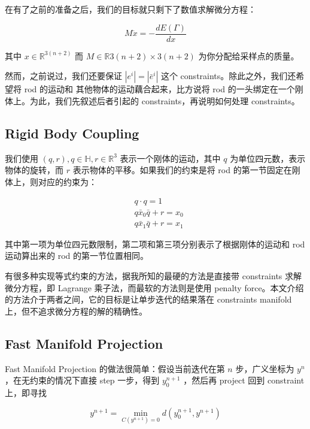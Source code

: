 \documentclass{notes}
\begin{document}
在有了之前的准备之后，我们的目标就只剩下了数值求解微分方程：

\begin{equation}
	M \ddot{x} = - \frac{d E(\Gamma)}{d x}
\end{equation}

其中 $x \in \mathbb{R}^{3(n + 2)}$ 而 $M \in \mathbb{R}{3(n + 2) \times 3(n + 2)}$ 为你分配给采样点的质量。

然而，之前说过，我们还要保证 $\left|e^i\right| = \left|\bar{e}^i\right|$ 这个 constraints。除此之外，我们还希望将 rod 的运动和 其他物体的运动藕合起来，比方说将 rod 的一头绑定在一个刚体上。为此，我们先叙述后者引起的 constraints，再说明如何处理 constraints。

\subsection{Rigid Body Coupling}

我们使用 $(q, r), q \in \mathbb{H}, r \in \mathbb{R}^3$ 表示一个刚体的运动，其中 $q$ 为单位四元数，表示物体的旋转，而 $r$ 表示物体的平移。如果我们的约束是将 rod 的第一节固定在刚体上，则对应的约束为：

\begin{equation}
	\begin{aligned}
		&q \cdot q = 1 \\
		&q \bar{x}_0 \bar{q} + r = x_0 \\
		&q \bar{x}_1 \bar{q} + r = x_1
	\end{aligned}
\end{equation}

其中第一项为单位四元数限制，第二项和第三项分别表示了根据刚体的运动和 rod 运动算出来的 rod 的第一节位置相同。

有很多种实现等式约束的方法，据我所知的最硬的方法是直接带 constraints 求解微分方程，即 Lagrange 乘子法，而最软的方法则是使用 penalty force。本文介绍的方法介于两者之间，它的目标是让单步迭代的结果落在 constraints manifold 上，但不追求微分方程的解的精确性。

\subsection{Fast Manifold Projection}

Fast Manifold Projection 的做法很简单：假设当前迭代在第 $n$ 步，广义坐标为 $y^n$，在无约束的情况下直接 step 一步，得到 $y^{n + 1}_0$ ，然后再 project 回到 constraint 上，即寻找

\begin{equation}\label{eq:optimization}
	y^{n + 1} = \min_{C(y^{n + 1}) = 0} d(y^{n + 1}_0, y^{n + 1})
\end{equation}
\end{document}

